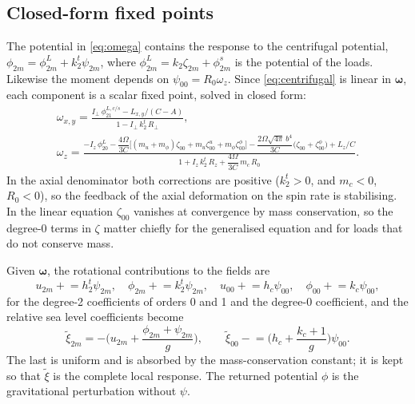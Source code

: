 \documentclass[11pt,a4paper]{article}
\numberwithin{equation}{section}
\begin{document}
\subsection{Closed-form fixed points}

The potential in \eqref{eq:omega} contains the response to the centrifugal
potential, $\phi_{2m}=\phi^{L}_{2m}+k^{t}_{2}\psi_{2m}$, where
$\phi^{L}_{2m} = k_{2}\zeta_{2m}+\phi^{s}_{2m}$ is the potential of the loads.
Likewise the moment depends on $\psi_{00}=R_{0}\omega_{z}$. Since
\eqref{eq:centrifugal} is linear in $\bm{\omega}$, each component is a scalar
fixed point, solved in closed form:
\begin{gather}
\omega_{x,y} = \frac{I_{\perp}\,\phi^{L,c/s}_{21} - L_{x,y}/(C-A)}
{1 - I_{\perp}\,k^{t}_{2}\,R_{\perp}},
\label{eq:transverse}\\[4pt]
\omega_{z} = \frac{-I_{z}\,\phi^{L}_{20}
 - \dfrac{4\Omega}{3C}\big[(m_{u}+m_{\phi})\zeta_{00}+m_{u}\zeta^{u}_{00}+m_{\phi}\zeta^{\phi}_{00}\big]
 - \dfrac{2\Omega\sqrt{4\pi}\,b^{4}}{3C}\big(\zeta_{00}+\zeta^{\phi}_{00}\big)
 + L_{z}/C}
{1 + I_{z}\,k^{t}_{2}\,R_{z} + \dfrac{4\Omega}{3C}\,m_{c}\,R_{0}}.
\label{eq:axialomega}
\end{gather}
In the axial denominator both corrections are positive ($k^{t}_{2}>0$, and
$m_{c}<0$, $R_{0}<0$), so the feedback of the axial deformation on the spin
rate is stabilising. In the linear equation $\zeta_{00}$ vanishes at convergence
by mass conservation, so the degree-0 terms in $\zeta$ matter chiefly for the
generalised equation and for loads that do not conserve mass.

Given $\bm{\omega}$, the rotational contributions to the fields are
\begin{equation}
u_{2m} \mathrel{+}= h^{t}_{2}\psi_{2m},\quad
\phi_{2m} \mathrel{+}= k^{t}_{2}\psi_{2m},\quad
u_{00} \mathrel{+}= h_{c}\psi_{00},\quad
\phi_{00} \mathrel{+}= k_{c}\psi_{00},
\end{equation}
for the degree-2 coefficients of orders 0 and 1 and the degree-0 coefficient,
and the relative sea level coefficients become
\begin{equation}
\tilde\xi_{2m} = -\Big(u_{2m}+\frac{\phi_{2m}+\psi_{2m}}{g}\Big),\qquad
\tilde\xi_{00} \mathrel{-}= \Big(h_{c}+\frac{k_{c}+1}{g}\Big)\psi_{00}.
\end{equation}
The last is uniform and is absorbed by the mass-conservation constant; it is
kept so that $\tilde\xi$ is the complete local response. The returned potential
$\phi$ is the gravitational perturbation without $\psi$.
\end{document}

